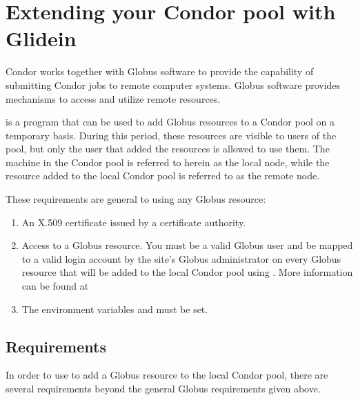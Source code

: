 \section{\label{sec:Glidein}Extending your Condor pool with Glidein}

Condor works together with Globus software to provide the capability
of submitting Condor jobs to remote computer systems.
Globus software provides mechanisms to access and utilize
remote resources.

 is a program that can be used to add Globus resources
to a Condor pool on a temporary basis.
During this period, these resources are visible 
to users of the pool, but only the user
that added the resources is allowed to use them.
The machine in the Condor pool is referred to herein as the
local node, while the resource added to the local Condor pool
is referred to as the remote node.

These requirements are general to using any Globus resource:
\begin{enumerate}

\item An X.509 certificate issued by a certificate authority.

\item Access to a Globus resource.
You must be a valid Globus user and be mapped to a valid login account by
the site's Globus administrator on every Globus resource that will be
added to the local Condor pool using .
More information can be found at 

\item The environment variables  and 
must be set.

\end{enumerate}


\subsection{ Requirements}
In order to use  to add a Globus resource to the
local Condor pool,
there are several requirements beyond the general Globus requirements
given above.

